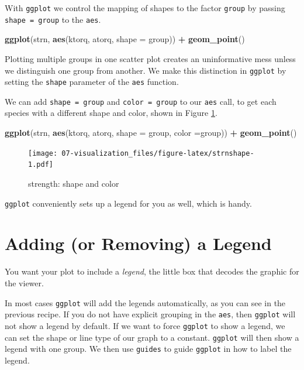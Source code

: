 \documentclass[
]{book}
\newenvironment{Shaded}{\begin{snugshade}}{\end{snugshade}}
\newcommand{\DataTypeTok}[1]{\textcolor[rgb]{0.13,0.29,0.53}{#1}}
\newcommand{\KeywordTok}[1]{\textcolor[rgb]{0.13,0.29,0.53}{\textbf{#1}}}
\newcommand{\NormalTok}[1]{#1}
\newcommand{\OperatorTok}[1]{\textcolor[rgb]{0.81,0.36,0.00}{\textbf{#1}}}
\newcommand{\StringTok}[1]{\textcolor[rgb]{0.31,0.60,0.02}{#1}}
\begin{document}
With \texttt{ggplot} we control the mapping of shapes to the factor \texttt{group} by passing \texttt{shape\ =\ group} to the \texttt{aes}.

\begin{Shaded}
\begin{Highlighting}[]
\KeywordTok{ggplot}\NormalTok{(strn, }\KeywordTok{aes}\NormalTok{(ktorq, atorq, }\DataTypeTok{shape =}\NormalTok{ group)) }\OperatorTok{+}
\StringTok{  }\KeywordTok{geom_point}\NormalTok{()}
\end{Highlighting}
\end{Shaded}

Plotting multiple groups in one scatter plot creates an uninformative
mess unless we distinguish one group from another. We make this distinction in \texttt{ggplot} by setting the \texttt{shape} parameter of the \texttt{aes} function.

We can add \texttt{shape\ =\ group} and \texttt{color\ =\ group} to our \texttt{aes} call, to get each species with a different shape and color, shown in Figure \ref{fig:strnshape}.

\begin{Shaded}
\begin{Highlighting}[]
\KeywordTok{ggplot}\NormalTok{(strn, }\KeywordTok{aes}\NormalTok{(ktorq, atorq, }\DataTypeTok{shape =}\NormalTok{ group, }\DataTypeTok{color =}\NormalTok{group)) }\OperatorTok{+}
\StringTok{  }\KeywordTok{geom_point}\NormalTok{()}
\end{Highlighting}
\end{Shaded}

\begin{figure}
\centering
\texttt{[image: 07-visualization\_files/figure-latex/strnshape-1.pdf]}
\caption{\label{fig:strnshape}strength: shape and color}
\end{figure}

\texttt{ggplot} conveniently sets up a legend for you as well, which is handy.

\hypertarget{adding-or-removing-a-legend}{%
\section{Adding (or Removing) a Legend}\label{adding-or-removing-a-legend}}

You want your plot to include a \emph{legend}, the little box that decodes
the graphic for the viewer.

In most cases \texttt{ggplot} will add the legends automatically, as you can see in the previous recipe. If you do not have explicit grouping in the \texttt{aes}, then \texttt{ggplot} will not show a legend by default. If we want to force \texttt{ggplot} to show a legend, we can set the shape or line type of our graph to a constant. \texttt{ggplot} will then show a legend with one group. We then use \texttt{guides} to guide \texttt{ggplot} in how to label the legend.
\end{document}
